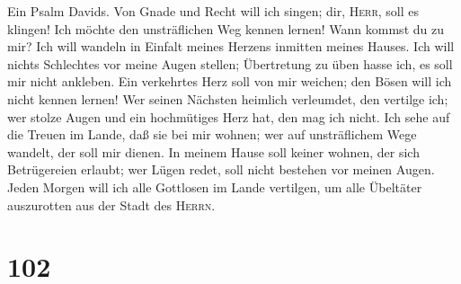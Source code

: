  Ein Psalm Davids. Von Gnade und Recht will ich singen;
dir, \textsc{Herr}, soll es klingen!  Ich möchte den
unsträflichen Weg kennen lernen! Wann kommst du zu mir? Ich will wandeln
in Einfalt meines Herzens inmitten meines Hauses.  Ich
will nichts Schlechtes vor meine Augen stellen; Übertretung zu üben
hasse ich, es soll mir nicht ankleben.  Ein verkehrtes
Herz soll von mir weichen; den Bösen will ich nicht kennen lernen!
 Wer seinen Nächsten heimlich verleumdet, den vertilge
ich; wer stolze Augen und ein hochmütiges Herz hat, den mag ich nicht.
 Ich sehe auf die Treuen im Lande, daß sie bei mir wohnen;
wer auf unsträflichem Wege wandelt, der soll mir dienen. 
In meinem Hause soll keiner wohnen, der sich Betrügereien erlaubt; wer
Lügen redet, soll nicht bestehen vor meinen Augen.  Jeden
Morgen will ich alle Gottlosen im Lande vertilgen, um alle Übeltäter
auszurotten aus der Stadt des \textsc{Herrn}.

\hypertarget{section-101}{%
\section{102}\label{section-101}}

